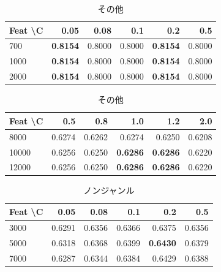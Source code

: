 \documentclass[uplatex, dvipdfmx, 11pt, a4paper, report]{jsbook}
\begin{document}
\begin{table}[H]
    \centering
    \small
    \begin{minipage}[t]{0.48\textwidth}
        \centering
        \caption{リプレイ}
        \begin{tabular}{l|rrrrr}
            \hline
            Feat \textbackslash C & 0.05 & 0.08 & 0.1 & 0.2 & 0.5 \\ \hline
            700 & \textbf{0.8154} & 0.8000 & 0.8000 & \textbf{0.8154} & 0.8000 \\
            1000 & \textbf{0.8154} & 0.8000 & 0.8000 & \textbf{0.8154} & 0.8000 \\
            2000 & \textbf{0.8154} & 0.8000 & 0.8000 & \textbf{0.8154} & 0.8000 \\ \hline
        \end{tabular}
    \end{minipage}
    \hfill
    \begin{minipage}[t]{0.48\textwidth}
        \centering
        \caption{その他}
        \begin{tabular}{l|rrrrr}
            \hline
            Feat \textbackslash C & 0.5 & 0.8 & 1.0 & 1.2 & 2.0 \\ \hline
            8000 & 0.6274 & 0.6262 & 0.6274 & 0.6250 & 0.6208 \\
            10000 & 0.6256 & 0.6250 & \textbf{0.6286} & \textbf{0.6286} & 0.6220 \\
            12000 & 0.6256 & 0.6250 & \textbf{0.6286} & \textbf{0.6286} & 0.6220 \\ \hline
        \end{tabular}
    \end{minipage}
\end{table}

\begin{table}[H]
    \centering
    \small
    \begin{minipage}[t]{0.48\textwidth}
        \centering
        \caption{ノンジャンル}
        \begin{tabular}{l|rrrrr}
            \hline
            Feat \textbackslash C & 0.05 & 0.08 & 0.1 & 0.2 & 0.5 \\ \hline
            3000 & 0.6291 & 0.6356 & 0.6366 & 0.6375 & 0.6356 \\
            5000 & 0.6318 & 0.6368 & 0.6399 & \textbf{0.6430} & 0.6379 \\
            7000 & 0.6287 & 0.6344 & 0.6384 & 0.6429 & 0.6388 \\ \hline
        \end{tabular}
    \end{minipage}
    \hfill
    \begin{minipage}[t]{0.48\textwidth}
    \end{minipage}
\end{table}
\end{document}
